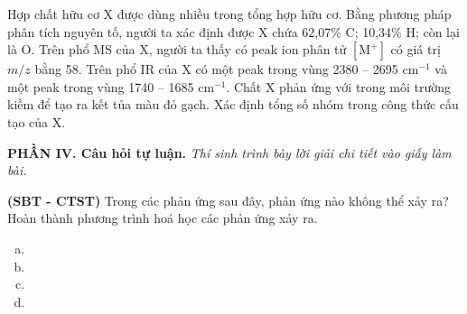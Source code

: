 \documentclass[12pt,a4paper]{article}
\begin{document}
\begin{ex}
Hợp chất hữu cơ X được dùng nhiều trong tổng hợp hữu cơ. Bằng phương pháp phân tích nguyên tố, người ta xác định được X chứa 62,07\% C; 10,34\% H; còn lại là O. Trên phổ MS của X, người ta thấy có peak ion phân tử $[\text{M}^+]$ có giá trị $m/z$ bằng 58. Trên phổ IR của X có một peak trong vùng 2380 -- 2695 cm$^{-1}$ và một peak trong vùng 1740 -- 1685 cm$^{-1}$. Chất X phản ứng với  trong môi trường kiềm để tạo ra kết tủa màu đỏ gạch. Xác định tổng số nhóm  trong công thức cấu tạo của X.

\end{ex}

\bigskip
\noindent\textbf{\large PHẦN IV. Câu hỏi tự luận.}
\textit{Thí sinh trình bày lời giải chi tiết vào giấy làm bài.}
\vspace{0.2cm}

\begin{ex}
\textbf{(SBT - CTST)} Trong các phản ứng sau đây, phản ứng nào không thể xảy ra? Hoàn thành phương trình hoá học các phản ứng xảy ra.
\begin{enumerate}[a)]
  \item {}
  \item {}
  \item {}
  \item {}
\end{enumerate}

\end{ex}
\end{document}
